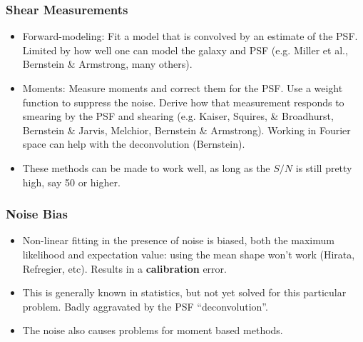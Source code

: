 \documentclass{beamer}
\begin{document}



\frame
{
    \frametitle{Shear Measurements}
    
    \begin{itemize}

        \item Forward-modeling: Fit a model that is convolved by an estimate of
            the PSF. Limited by how well one can model the galaxy and PSF (e.g.
            Miller et al., Bernstein \& Armstrong, many others).

        \item Moments: Measure moments and correct them for the PSF.  Use a
            weight function to suppress the noise. Derive how that measurement
            responds to smearing by the PSF and shearing (e.g.  Kaiser,
            Squires, \& Broadhurst, Bernstein \& Jarvis, Melchior, Bernstein \&
            Armstrong).  Working in Fourier space can help with the
            deconvolution (Bernstein).

        \item These methods can be made to work well, as long as the $S/N$ is
            still pretty high, say 50 or higher.

    \end{itemize}
}

\frame
{
    \frametitle{Noise Bias}

    \begin{itemize}

        \item Non-linear fitting in the presence of noise is biased, both the
            maximum likelihood and expectation value: using the mean shape
            won't work (Hirata, Refregier, etc).   Results in a {\bf
            calibration} error.

        \item This is generally known in statistics, but not yet solved for
            this particular problem. Badly aggravated by the PSF
            ``deconvolution''.

        \item The noise also causes problems for moment based methods.

    \end{itemize}
}
\end{document}
